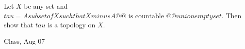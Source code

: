 \begin{samepage}
\begin{ex}
Let $X$ be any set and 
$tau = {{ A subset of X such that X minus A @@\text{ is countable }@@ }} union {{ empty set }} $.
Then show that $tau$ is a topology on $X$.
\end{ex}
\begin{source}
Class, Aug 07
\end{source}
\end{samepage}
